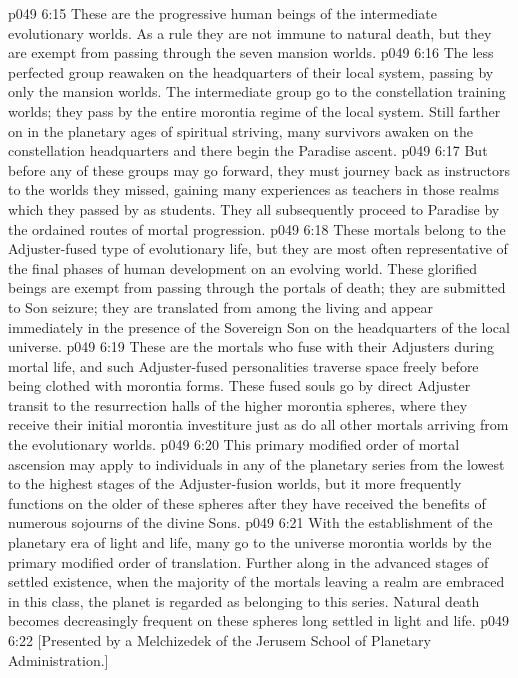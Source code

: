 \vs p049 6:15 \bibnobreakspace {} These are the progressive human beings of the intermediate evolutionary worlds. As a rule they are not immune to natural death, but they are exempt from passing through the seven mansion worlds.
\vs p049 6:16 The less perfected group reawaken on the headquarters of their local system, passing by only the mansion worlds. The intermediate group go to the constellation training worlds; they pass by the entire morontia regime of the local system. Still farther on in the planetary ages of spiritual striving, many survivors awaken on the constellation headquarters and there begin the Paradise ascent.
\vs p049 6:17 But before any of these groups may go forward, they must journey back as instructors to the worlds they missed, gaining many experiences as teachers in those realms which they passed by as students. They all subsequently proceed to Paradise by the ordained routes of mortal progression.
\vs p049 6:18 \bibnobreakspace {} These mortals belong to the Adjuster\hyp{}fused type of evolutionary life, but they are most often representative of the final phases of human development on an evolving world. These glorified beings are exempt from passing through the portals of death; they are submitted to Son seizure; they are translated from among the living and appear immediately in the presence of the Sovereign Son on the headquarters of the local universe.
\vs p049 6:19 These are the mortals who fuse with their Adjusters during mortal life, and such Adjuster\hyp{}fused personalities traverse space freely before being clothed with morontia forms. These fused souls go by direct Adjuster transit to the resurrection halls of the higher morontia spheres, where they receive their initial morontia investiture just as do all other mortals arriving from the evolutionary worlds.
\vs p049 6:20 This primary modified order of mortal ascension may apply to individuals in any of the planetary series from the lowest to the highest stages of the Adjuster\hyp{}fusion worlds, but it more frequently functions on the older of these spheres after they have received the benefits of numerous sojourns of the divine Sons.
\vs p049 6:21 With the establishment of the planetary era of light and life, many go to the universe morontia worlds by the primary modified order of translation. Further along in the advanced stages of settled existence, when the majority of the mortals leaving a realm are embraced in this class, the planet is regarded as belonging to this series. Natural death becomes decreasingly frequent on these spheres long settled in light and life.
\vsetoff
\vs p049 6:22 [Presented by a Melchizedek of the Jerusem School of Planetary Administration.]
\quizlink
